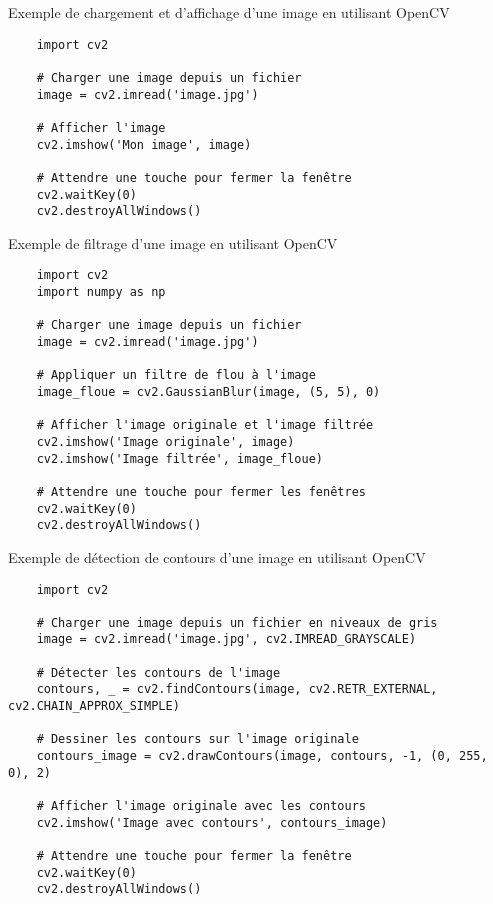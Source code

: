 \begin{frame}[fragile]{Exemple de chargement et d'affichage d'une image en utilisant OpenCV}
    \begin{verbatim}
    import cv2

    # Charger une image depuis un fichier
    image = cv2.imread('image.jpg')

    # Afficher l'image
    cv2.imshow('Mon image', image)

    # Attendre une touche pour fermer la fenêtre
    cv2.waitKey(0)
    cv2.destroyAllWindows()
    \end{verbatim}
\end{frame}

\begin{frame}[fragile]{Exemple de filtrage d'une image en utilisant OpenCV}
    \begin{verbatim}
    import cv2
    import numpy as np

    # Charger une image depuis un fichier
    image = cv2.imread('image.jpg')

    # Appliquer un filtre de flou à l'image
    image_floue = cv2.GaussianBlur(image, (5, 5), 0)

    # Afficher l'image originale et l'image filtrée
    cv2.imshow('Image originale', image)
    cv2.imshow('Image filtrée', image_floue)

    # Attendre une touche pour fermer les fenêtres
    cv2.waitKey(0)
    cv2.destroyAllWindows()
    \end{verbatim}
\end{frame}

\begin{frame}[fragile]{Exemple de détection de contours d'une image en utilisant OpenCV}
    \begin{verbatim}
    import cv2

    # Charger une image depuis un fichier en niveaux de gris
    image = cv2.imread('image.jpg', cv2.IMREAD_GRAYSCALE)

    # Détecter les contours de l'image
    contours, _ = cv2.findContours(image, cv2.RETR_EXTERNAL, cv2.CHAIN_APPROX_SIMPLE)

    # Dessiner les contours sur l'image originale
    contours_image = cv2.drawContours(image, contours, -1, (0, 255, 0), 2)

    # Afficher l'image originale avec les contours
    cv2.imshow('Image avec contours', contours_image)

    # Attendre une touche pour fermer la fenêtre
    cv2.waitKey(0)
    cv2.destroyAllWindows()
    \end{verbatim}
\end{frame}

